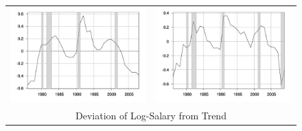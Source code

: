 \documentclass[12pt]{article}
\begin{document}
\begin{figure}
\begin{center}
\begin{tabular}{cc}
\includegraphics[scale=0.16]{pitchers/salsres.png} & \includegraphics[scale=0.16]{hitters/salsres.png} \\
\multicolumn{2}{c}{Deviation of Log-Salary from Trend} \\
\end{tabular}
\end{center}
\end{figure}
\end{document}
